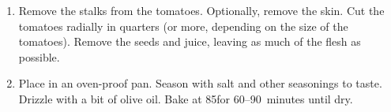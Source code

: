 
\begin{ingredients}
\end{ingredients}


\begin{recipe}
  \begin{enumerate}

  \item Remove the stalks from the tomatoes.  Optionally, remove the
    skin.  Cut the tomatoes radially in quarters (or more, depending
    on the size of the tomatoes).  Remove the seeds and juice, leaving
    as much of the flesh as possible.

  \item Place in an oven-proof pan.  Season with salt and other
    seasonings to taste.  Drizzle with a bit of olive oil.  Bake at
    85\C for 60--90~minutes until dry.

  \end{enumerate}
\end{recipe}

